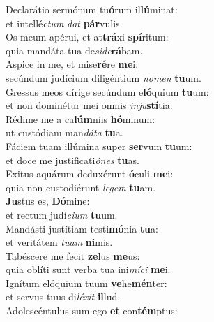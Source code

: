 \evenverse Declarátio sermónum tu\textbf{ó}rum il\textbf{lú}minat:~\*\\
\evenverse et intellé\textit{ctum} \textit{dat} \textbf{pár}vulis.\\
\oddverse Os meum apérui, et at\textbf{trá}xi \textbf{spí}ritum:~\*\\
\oddverse quia mandáta tua de\textit{si}\textit{de}\textbf{rá}bam.\\
\evenverse Aspice in me, et mise\textbf{ré}re \textbf{me}i:~\*\\
\evenverse secúndum judícium diligéntium \textit{no}\textit{men} \textbf{tu}um.\\
\oddverse Gressus meos dírige secúndum e\textbf{ló}quium \textbf{tu}um:~\*\\
\oddverse et non dominétur mei omnis \textit{in}\textit{ju}\textbf{stí}tia.\\
\evenverse Rédime me a ca\textbf{lúm}niis \textbf{hó}minum:~\*\\
\evenverse ut custódiam man\textit{dá}\textit{ta} \textbf{tu}a.\\
\oddverse Fáciem tuam illúmina super \textbf{ser}vum \textbf{tu}um:~\*\\
\oddverse et doce me justificati\textit{ó}\textit{nes} \textbf{tu}as.\\
\evenverse Exitus aquárum deduxérunt \textbf{ó}culi \textbf{me}i:~\*\\
\evenverse quia non custodiérunt \textit{le}\textit{gem} \textbf{tu}am.\\
\oddverse \textbf{Ju}stus es, \textbf{Dó}mine:~\*\\
\oddverse et rectum judí\textit{ci}\textit{um} \textbf{tu}um.\\
\evenverse Mandásti justítiam testi\textbf{mó}nia \textbf{tu}a:~\*\\
\evenverse et veritátem \textit{tu}\textit{am} \textbf{ni}mis.\\
\oddverse Tabéscere me fecit \textbf{ze}lus \textbf{me}us:~\*\\
\oddverse quia oblíti sunt verba tua ini\textit{mí}\textit{ci} \textbf{me}i.\\
\evenverse Ignítum elóquium tuum \textbf{ve}he\textbf{mén}ter:~\*\\
\evenverse et servus tuus di\textit{lé}\textit{xit} \textbf{il}lud.\\
\oddverse Adolescéntulus sum ego \textbf{et} con\textbf{tém}ptus:~\*\\
